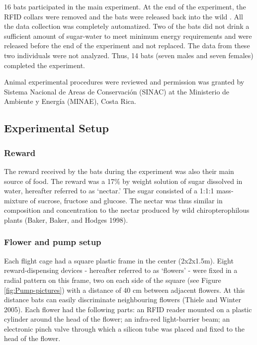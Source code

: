 \documentclass[
]{article}
\begin{document}
16 bats participated in the main experiment. At the end of the experiment, the RFID collars were removed and the bats were released back into the wild . All the data collection was completely automatized. Two of the bats did not drink a sufficient amount of sugar-water to meet minimum energy requirements and were released before the end of the experiment and not replaced. The data from these two individuals were not analyzed. Thus, 14 bats (seven males and seven females) completed the experiment.

Animal experimental procedures were reviewed and permission was granted by Sistema Nacional de Areas de Conservación (SINAC) at the Ministerio de Ambiente y Energía (MINAE), Costa Rica.

\hypertarget{experimental-setup}{%
\subsection{Experimental Setup}\label{experimental-setup}}

\hypertarget{reward}{%
\subsubsection{Reward}\label{reward}}

The reward received by the bats during the experiment was also their main source of food. The reward was a 17\% by weight solution of sugar dissolved in water, hereafter referred to as `nectar.' The sugar consisted of a 1:1:1 mass-mixture of sucrose, fructose and glucose. The nectar was thus similar in composition and concentration to the nectar produced by wild chiropterophilous plants (Baker, Baker, and Hodges 1998).

\hypertarget{flower-and-pump-setup}{%
\subsubsection{Flower and pump setup}\label{flower-and-pump-setup}}

Each flight cage had a square plastic frame in the center (2x2x1.5m). Eight reward-dispensing devices - hereafter referred to as `flowers' - were fixed in a radial pattern on this frame, two on each side of the square (see Figure \ref{fig:Pump-pictures}) with a distance of 40 cm between adjacent flowers. At this distance bats can easily discriminate neighbouring flowers (Thiele and Winter 2005). Each flower had the following parts: an RFID reader mounted on a plastic cylinder around the head of the flower; an infra-red light-barrier beam; an electronic pinch valve through which a silicon tube was placed and fixed to the head of the flower.
\end{document}
